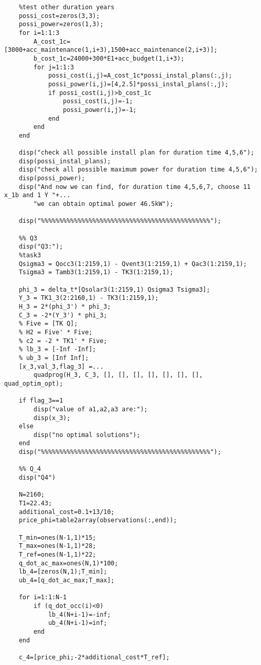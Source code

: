 \documentclass[titlepage,a4paper]{article}
\begin{document}
\begin{lstlisting}
    %test other duration years
    possi_cost=zeros(3,3);
    possi_power=zeros(1,3);
    for i=1:1:3
        A_cost_1c=[3000+acc_maintenance(1,i+3),1500+acc_maintenance(2,i+3)];
        b_cost_1c=24000+300*E1+acc_budget(1,i+3);
        for j=1:1:3
            possi_cost(i,j)=A_cost_1c*possi_instal_plans(:,j);
            possi_power(i,j)=[4,2.5]*possi_instal_plans(:,j);       
            if possi_cost(i,j)>b_cost_1c
                possi_cost(i,j)=-1;
                possi_power(i,j)=-1;
            end
        end
    end
    
    disp("check all possible install plan for duration time 4,5,6");
    disp(possi_instal_plans);
    disp("check all possible maximum power for duration time 4,5,6");
    disp(possi_power);
    disp("And now we can find, for duration time 4,5,6,7, choose 11 x_1b and 1 Y "+...
        "we can obtain optimal power 46.5kW");
    
    disp("%%%%%%%%%%%%%%%%%%%%%%%%%%%%%%%%%%%%%%%%%%%%%%");
    
    %% Q3
    disp("Q3:");
    %task3
    Qsigma3 = Qocc3(1:2159,1) - Qvent3(1:2159,1) + Qac3(1:2159,1);
    Tsigma3 = Tamb3(1:2159,1) - TK3(1:2159,1);
    
    phi_3 = delta_t*[Qsolar3(1:2159,1) Qsigma3 Tsigma3];
    Y_3 = TK1_3(2:2160,1) - TK3(1:2159,1);
    H_3 = 2*(phi_3') * phi_3;
    C_3 = -2*(Y_3') * phi_3;
    % Five = [TK Q];
    % H2 = Five' * Five;
    % c2 = -2 * TK1' * Five;
    % lb_3 = [-Inf -Inf];
    % ub_3 = [Inf Inf];
    [x_3,val_3,flag_3] =...
        quadprog(H_3, C_3, [], [], [], [], [], [], [], quad_optim_opt);
    
    if flag_3==1
        disp("value of a1,a2,a3 are:");
        disp(x_3);
    else
        disp("no optimal solutions");
    end
    disp("%%%%%%%%%%%%%%%%%%%%%%%%%%%%%%%%%%%%%%%%%%%%%%");
    
    %% Q_4
    disp("Q4")
    
    N=2160;
    T1=22.43;
    additional_cost=0.1+13/10;   
    price_phi=table2array(observations(:,end));
    
    T_min=ones(N-1,1)*15;
    T_max=ones(N-1,1)*28;
    T_ref=ones(N-1,1)*22;
    q_dot_ac_max=ones(N,1)*100;
    lb_4=[zeros(N,1);T_min];
    ub_4=[q_dot_ac_max;T_max];
    
    for i=1:1:N-1
        if (q_dot_occ(i)<0)
            lb_4(N+i-1)=-inf;
            ub_4(N+i-1)=inf;
        end
    end
    
    c_4=[price_phi;-2*additional_cost*T_ref];
    

\end{lstlisting}
\end{document}

